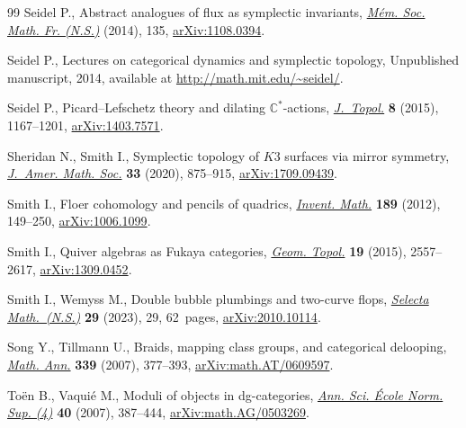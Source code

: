 \documentclass[10pt,a4paper]{amsart}
\theoremstyle{definition}
\numberwithin{equation}{section}
\begin{document}
\begin{thebibliography}{99}
Seidel P., Abstract analogues of flux as symplectic invariants,
 \href{https://doi.org/10.24033/msmf.447}{\textit{M\'em. Soc. Math. Fr.
 (N.S.)}} (2014), 135,
 \href{http://arxiv.org/abs/1108.0394}{arXiv:1108.0394}.

Seidel P., Lectures on categorical dynamics and symplectic topology,
 {U}npublished manuscript, 2014, available at
 \url{http://math.mit.edu/~seidel/}.

Seidel P., Picard--{L}efschetz theory and dilating {$\mathbb{C}^*$}-actions,
 \href{https://doi.org/10.1112/jtopol/jtv029}{\textit{J.~Topol.}} \textbf{8}
 (2015), 1167--1201, \href{http://arxiv.org/abs/1403.7571}{arXiv:1403.7571}.

Sheridan N., Smith I., Symplectic topology of {$K3$} surfaces via mirror
 symmetry, \href{https://doi.org/10.1090/jams/946}{\textit{J.~Amer. Math.
 Soc.}} \textbf{33} (2020), 875--915,
 \href{http://arxiv.org/abs/1709.09439}{arXiv:1709.09439}.

Smith I., Floer cohomology and pencils of quadrics,
 \href{https://doi.org/10.1007/s00222-011-0364-1}{\textit{Invent. Math.}}
 \textbf{189} (2012), 149--250,
 \href{http://arxiv.org/abs/1006.1099}{arXiv:1006.1099}.

Smith I., Quiver algebras as {F}ukaya categories,
 \href{https://doi.org/10.2140/gt.2015.19.2557}{\textit{Geom. Topol.}}
 \textbf{19} (2015), 2557--2617,
 \href{http://arxiv.org/abs/1309.0452}{arXiv:1309.0452}.

Smith I., Wemyss M., Double bubble plumbings and two-curve flops,
 \href{https://doi.org/10.1007/s00029-023-00828-z}{\textit{Selecta
 Math.~(N.S.)}} \textbf{29} (2023), 29, 62~pages,
 \href{http://arxiv.org/abs/2010.10114}{arXiv:2010.10114}.

Song Y., Tillmann U., Braids, mapping class groups, and categorical delooping,
 \href{https://doi.org/10.1007/s00208-007-0117-z}{\textit{Math. Ann.}}
 \textbf{339} (2007), 377--393, \href{http://arxiv.org/abs/math.AT/0609597}{arXiv:math.AT/0609597}.

To\"{e}n B., Vaqui\'e M., Moduli of objects in dg-categories,
 \href{https://doi.org/10.1016/j.ansens.2007.05.001}{\textit{Ann. Sci.
 \'{E}cole Norm. Sup. (4)}} \textbf{40} (2007), 387--444, \href{http://arxiv.org/abs/math.AG/0503269}{arXiv:math.AG/0503269}.


\end{thebibliography}
\end{document}
